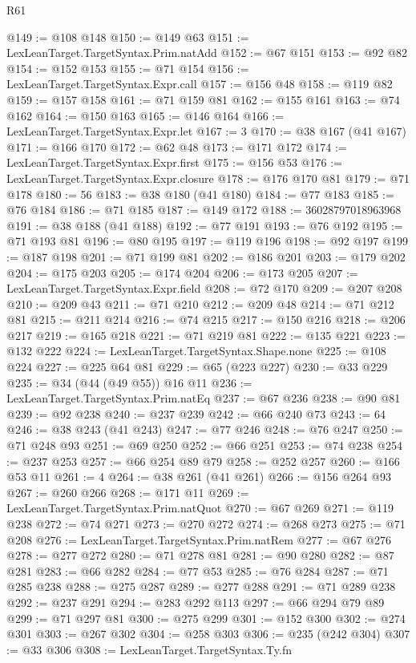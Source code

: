 \begin{lexlean}{R61}
\begin{coremodule}
@149 := @108 @148
@150 := @149 @63
@151 := LexLeanTarget.TargetSyntax.Prim.natAdd
@152 := @67 @151
@153 := @92 @82
@154 := @152 @153
@155 := @71 @154
@156 := LexLeanTarget.TargetSyntax.Expr.call
@157 := @156 @48
@158 := @119 @82
@159 := @157 @158
@161 := @71 @159 @81
@162 := @155 @161
@163 := @74 @162
@164 := @150 @163
@165 := @146 @164
@166 := LexLeanTarget.TargetSyntax.Expr.let
@167 := 3
@170 := @38 @167 (@41 @167)
@171 := @166 @170
@172 := @62 @48
@173 := @171 @172
@174 := LexLeanTarget.TargetSyntax.Expr.first
@175 := @156 @53
@176 := LexLeanTarget.TargetSyntax.Expr.closure
@178 := @176 @170 @81
@179 := @71 @178
@180 := 56
@183 := @38 @180 (@41 @180)
@184 := @77 @183
@185 := @76 @184
@186 := @71 @185
@187 := @149 @172
@188 := 36028797018963968
@191 := @38 @188 (@41 @188)
@192 := @77 @191
@193 := @76 @192
@195 := @71 @193 @81
@196 := @80 @195
@197 := @119 @196
@198 := @92 @197
@199 := @187 @198
@201 := @71 @199 @81
@202 := @186 @201
@203 := @179 @202
@204 := @175 @203
@205 := @174 @204
@206 := @173 @205
@207 := LexLeanTarget.TargetSyntax.Expr.field
@208 := @72 @170
@209 := @207 @208
@210 := @209 @43
@211 := @71 @210
@212 := @209 @48
@214 := @71 @212 @81
@215 := @211 @214
@216 := @74 @215
@217 := @150 @216
@218 := @206 @217
@219 := @165 @218
@221 := @71 @219 @81
@222 := @135 @221
@223 := @132 @222
@224 := LexLeanTarget.TargetSyntax.Shape.none
@225 := @108 @224
@227 := @225 @64 @81
@229 := @65 (@223 @227)
@230 := @33 @229
@235 := @34 (@44 (@49 @55)) @16 @11
@236 := LexLeanTarget.TargetSyntax.Prim.natEq
@237 := @67 @236
@238 := @90 @81
@239 := @92 @238
@240 := @237 @239
@242 := @66 @240 @73
@243 := 64
@246 := @38 @243 (@41 @243)
@247 := @77 @246
@248 := @76 @247
@250 := @71 @248 @93
@251 := @69 @250
@252 := @66 @251
@253 := @74 @238
@254 := @237 @253
@257 := @66 @254 @89 @79
@258 := @252 @257
@260 := @166 @53 @11
@261 := 4
@264 := @38 @261 (@41 @261)
@266 := @156 @264 @93
@267 := @260 @266
@268 := @171 @11
@269 := LexLeanTarget.TargetSyntax.Prim.natQuot
@270 := @67 @269
@271 := @119 @238
@272 := @74 @271
@273 := @270 @272
@274 := @268 @273
@275 := @71 @208
@276 := LexLeanTarget.TargetSyntax.Prim.natRem
@277 := @67 @276
@278 := @277 @272
@280 := @71 @278 @81
@281 := @90 @280
@282 := @87 @281
@283 := @66 @282
@284 := @77 @53
@285 := @76 @284
@287 := @71 @285 @238
@288 := @275 @287
@289 := @277 @288
@291 := @71 @289 @238
@292 := @237 @291
@294 := @283 @292 @113
@297 := @66 @294 @79 @89
@299 := @71 @297 @81
@300 := @275 @299
@301 := @152 @300
@302 := @274 @301
@303 := @267 @302
@304 := @258 @303
@306 := @235 (@242 @304)
@307 := @33 @306
@308 := LexLeanTarget.TargetSyntax.Ty.fn

\end{coremodule}
\end{lexlean}
